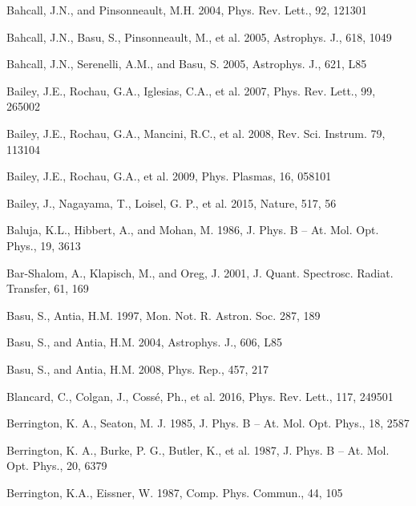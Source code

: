 \documentclass[11pt, double, phd]{osudiss-2}
\begin{document}
\begin {thebibliography} {}
 Bahcall, J.N., and Pinsonneault, M.H. 2004,  Phys. Rev. Lett., 92, 121301

 Bahcall, J.N., Basu, S., Pinsonneault, M., et al. 2005, Astrophys. J., 618, 1049

 Bahcall, J.N., Serenelli, A.M., and Basu, S. 2005, Astrophys. J., 621, L85

 Bailey, J.E., Rochau, G.A., Iglesias, C.A., et al. 2007, Phys. Rev. Lett., 99, 265002

 Bailey, J.E., Rochau, G.A., Mancini, R.C., et al. 2008, Rev. Sci. Instrum. 79, 113104

 Bailey, J.E., Rochau, G.A., et al. 2009, Phys. Plasmas, 16, 058101

 Bailey, J., Nagayama, T., Loisel, G. P., et al. 2015, Nature, 517, 56

 Baluja, K.L., Hibbert, A., and Mohan, M. 1986, J. Phys. B -- At. Mol. Opt. Phys., 19, 3613

 Bar-Shalom, A., Klapisch, M., and Oreg, J. 2001, J. Quant. Spectrosc. Radiat. Transfer, 61, 169

 Basu, S., Antia, H.M. 1997, Mon. Not. R. Astron. Soc. 287, 189

 Basu, S., and Antia, H.M. 2004, Astrophys. J., 606, L85

 Basu, S., and Antia, H.M. 2008, Phys. Rep., 457, 217

 Blancard, C., Colgan, J., Coss\'e, Ph., et al. 2016, Phys. Rev. Lett., 117, 249501

 Berrington, K. A., Seaton, M. J. 1985, J. Phys. B -- At. Mol. Opt. Phys., 18, 2587

 Berrington, K. A., Burke, P. G., Butler, K., et al. 1987, J. Phys. B -- At. Mol. Opt. Phys., 20, 6379

 Berrington, K.A., Eissner, W. 1987, Comp. Phys. Commun., 44, 105


\end{thebibliography}
\end{document}

